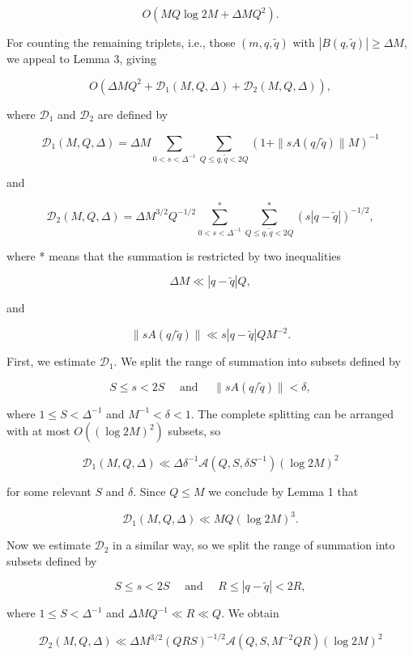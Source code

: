 \documentclass[10pt]{article}
\begin{document}
$$
O\left(M Q \log 2 M+\Delta M Q^{2}\right) .
$$

For counting the remaining triplets, i.e., those $(m, q, \tilde{q})$ with $|B(q, \tilde{q})| \geqslant \Delta M$, we appeal to Lemma 3, giving

$$
O\left(\Delta M Q^{2}+\mathscr{D}_{1}(M, Q, \Delta)+\mathscr{D}_{2}(M, Q, \Delta)\right),
$$

where $\mathscr{D}_{1}$ and $\mathscr{D}_{2}$ are defined by

$$
\mathscr{D}_{1}(M, Q, \Delta)=\Delta M \sum_{0<s<\Delta^{-1}} \sum_{Q \leqslant q, \tilde{q}<2 Q}(1+\|s A(q / \tilde{q})\| M)^{-1}
$$

and

$$
\mathscr{D}_{2}(M,Q,\Delta)=\Delta M^{3/2}Q^{-1/2}
\sum_{0<s<\Delta^{-1}}^{*}\sum_{Q\leqslant q,\tilde q<2Q}^{*}
(s|q-\tilde q|)^{-1/2},
$$

where * means that the summation is restricted by two inequalities

$$
\Delta M\ll |q-\tilde q|Q,
$$

and

$$
\|sA(q/\tilde q)\|\ll s|q-\tilde q|QM^{-2} .
$$

First, we estimate $\mathscr{D}_{1}$. We split the range of summation into subsets defined by

$$
S \leqslant s<2 S \quad \text { and } \quad\|s A(q / \tilde{q})\|<\delta,
$$

where $1 \leqslant S<\Delta^{-1}$ and $M^{-1}<\delta<1$. The complete splitting can be arranged with at most $O\left((\log 2 M)^{2}\right)$ subsets, so

$$
\mathscr{D}_{1}(M,Q,\Delta)\ll \Delta\delta^{-1} \mathscr{A}\left(Q, S, \delta S^{-1}\right)(\log 2 M)^{2}
$$

for some relevant $S$ and $\delta$. Since $Q \leqslant M$ we conclude by Lemma 1 that

$$
\mathscr{D}_{1}(M, Q, \Delta) \ll M Q(\log 2 M)^{3} .
$$

Now we estimate $\mathscr{D}_{2}$ in a similar way, so we split the range of summation into subsets defined by

$$
S \leqslant s<2 S \quad \text { and } \quad R \leqslant|q-\tilde{q}|<2 R,
$$

where $1 \leqslant S<\Delta^{-1}$ and $\Delta M Q^{-1} \ll R \ll Q$. We obtain

$$
\mathscr{D}_{2}(M,Q,\Delta)\ll\Delta M^{3/2}(QRS)^{-1/2} \mathscr{A}\left(Q, S, M^{-2} Q R\right)(\log 2 M)^{2}
$$
\end{document}
